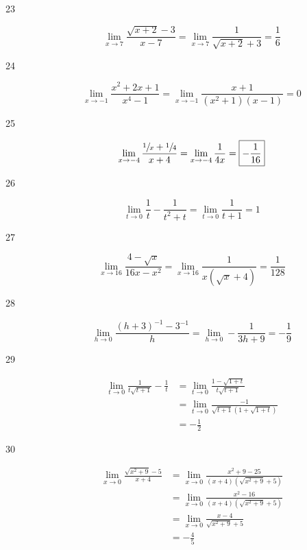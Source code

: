 \documentclass[letterpaper]{exam}
\begin{document}
\begin{description}
      \item[23]
        \[
          \lim_{x \to 7} \frac{\sqrt{x+2}-3}{x-7} 
            = \lim_{x \to 7} \frac{1}{\sqrt{x + 2} + 3} 
            = \boxed{ \frac{1}{6} } 
        \]

      \item[24]
        \[
          \lim_{x \to -1} \frac{x^2+2 x+1}{x^4-1} 
            = \lim_{x \to -1} \frac{x+1}{(x^2+1)(x-1)} 
            = \boxed{ 0 } 
        \]

      \item[25]
        \[
          \lim_{x \to -4} \frac{\sfrac{1}{x}+\sfrac{1}{4}}{x+4} 
            = \lim_{x \to -4} \frac{1}{4 x} 
            = \boxed{ -\frac{1}{16} } 
        \]

      \item[26]
        \[
          \lim_{t \to 0} \frac{1}{t}-\frac{1}{t^2+t} 
            = \lim_{t \to 0} \frac{1}{t + 1} 
            = \boxed{ 1 } 
        \]

      \item[27]
        \[
          \lim_{x \to 16} \frac{4-\sqrt{x}}{16 x-x^2} 
            = \lim_{x \to 16} \frac{1}{x (\sqrt{x} + 4)} 
            = \boxed{ \frac{1}{128} } 
        \]

      \item[28]
        \[
          \lim_{h \to 0} \frac{(h+3)^{-1}-3^{-1}}{h} 
            = \lim_{h \to 0} -\frac{1}{3 h+9} 
            = \boxed{ - \frac{1}{9} } 
        \]

      \item[29]
        \begin{align*}
          \lim_{t \to 0} \frac{1}{t \sqrt{t+1}}-\frac{1}{t} 
            & = \lim_{t \to 0} \frac{1 - \sqrt{1 + t}}{t \sqrt{t+1}} \\
            & = \lim_{t \to 0} \frac{-1}{\sqrt{t+1} (1 + \sqrt{1 + t})} \\
            & = \boxed{ - \frac{1}{2} }
        \end{align*}

      \item[30]
        \begin{align*}
          \lim_{x \to 0} \frac{\sqrt{x^2+9}-5}{x+4} 
            &= \lim_{x \to 0} \frac{x^2+9-25}{\left(x+4\right) \left(\sqrt{x^2+9}+5 \right)} \\
            & = \lim_{x \to 0} \frac{x^2-16}{\left(x+4\right) \left(\sqrt{x^2+9}+5 \right)} \\
            & = \lim_{x \to 0} \frac{x-4}{\sqrt{x^2+9}+5} \\
            & = \boxed{ - \frac{4}{5} }
        \end{align*}


\end{description}
\end{document}

